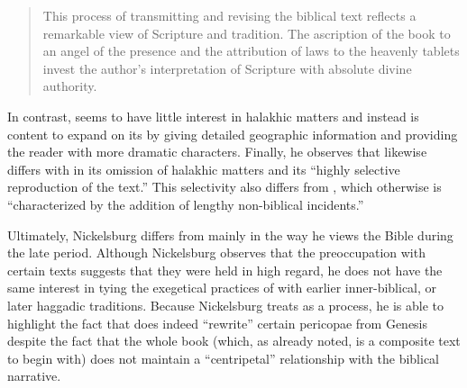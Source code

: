 \begin{quote}
    This process of transmitting and revising the biblical text reflects a remarkable view of Scripture and tradition. The \psgraphic ascription of the book to an angel of the presence and the attribution of laws to the heavenly tablets invest the author's interpretation of Scripture with absolute divine authority.%
    \autocite[101]{nickelsburg_stone1984}
\end{quote} 

In contrast, \ga seems to have little interest in halakhic matters and instead is content to expand on its \vorlagen by giving detailed geographic information and providing the reader with more dramatic characters.%
    \autocite[106]{nickelsburg_stone1984}
Finally, he observes that \lab likewise differs with \jub in its omission of halakhic matters and its ``highly selective reproduction of the text.''%
    \autocite[110]{nickelsburg_stone1984}
This selectivity also differs from \ga, which otherwise is ``characterized by the addition of lengthy non-biblical incidents.''%
    \autocite[110]{nickelsburg_stone1984} 

Ultimately, Nickelsburg differs from \vermes mainly in the way he views the Bible during the late \secondtemple period. Although Nickelsburg observes that the preoccupation with certain texts suggests that they were held in high regard, he does not have the same interest in tying the exegetical practices of \rwb with earlier inner-biblical, or later haggadic traditions. Because Nickelsburg treats \rwb as a process, he is able to highlight the fact that \firstenoch does indeed ``rewrite'' certain pericopae from Genesis despite the fact that the whole book (which, as already noted, is a composite text to begin with) does not maintain a ``centripetal'' relationship with the biblical narrative. 

